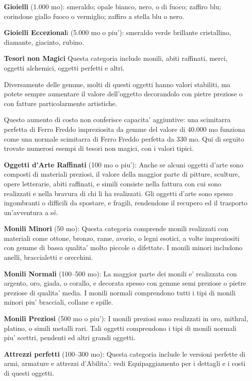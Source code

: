 \documentclass[a4paper,11pt,twoside,openany]{dndbook}
\begin{document}
\textbf{Gioielli} (1.000 mo): smeraldo; opale bianco, nero, o di fuoco; zaffiro blu; corindone giallo fuoco o vermiglio; zaffiro a stella blu o nero.

\textbf{Gioielli Eccezional}i (5.000 mo o piu'): smeraldo verde brillante cristallino, diamante, giacinto, rubino.

\textbf{Tesori non Magici} Questa categoria include monili, abiti raffinati, merci, oggetti alchemici, oggetti perfetti e altri.

Diversamente delle gemme, molti di questi oggetti hanno valori stabiliti, ma potete sempre aumentare il valore dell'oggetto decorandolo con pietre preziose o con fatture particolarmente artistiche.

Questo aumento di costo non conferisce capacita' aggiuntive: una scimitarra perfetta di Ferro Freddo impreziosita da gemme del valore di 40.000 mo funziona come una normale scimitarra di Ferro Freddo perfetta da 330 mo. Qui di seguito trovate numerosi esempi di tesori non magici, con i valori tipici.

\textbf{Oggetti d'Arte Raffinati} (100 mo o piu'): Anche se alcuni oggetti d'arte sono composti di materiali preziosi, il valore della maggior parte di pitture, sculture, opere letterarie, abiti raffinati, e simili consiste nella fattura con cui sono realizzati e nella bravura di chi li ha realizzati. Gli oggetti d'arte sono spesso ingombranti o difficili da spostare, e fragili, rendendone il recupero ed il trasporto un'avventura a sé.

\textbf{Monili Minori} (50 mo): Questa categoria comprende monili realizzati con materiali come ottone, bronzo, rame, avorio, o legni esotici, a volte impreziositi con gemme di bassa qualita' molto piccole o difettate. I monili minori includono anelli, braccialetti e orecchini.

\textbf{Monili Normali} (100--500 mo): La maggior parte dei monili e' realizzata con argento, oro, giada, o corallo, e decorata spesso con gemme semi preziose o pietre preziose di qualita' media. I monili normali comprendono tutti i tipi di monili minori piu' bracciali, collane e spille.

\textbf{Monili Preziosi} (500 mo o piu'): I monili preziosi sono realizzati in oro, mithral, platino, o simili metalli rari. Tali oggetti comprendono i tipi di monili normali piu' scettri, pendenti ed altri grandi oggetti. 

\textbf{Attrezzi perfetti} (100--300 mo): Questa categoria include le versioni perfette di armi, armature e attrezzi d'Abilita': vedi Equipaggiamento per i dettagli e i costi di questi oggetti.
\end{document}
